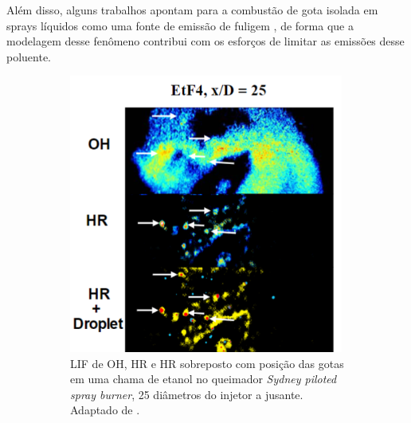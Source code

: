 Além disso, alguns trabalhos apontam para a combustão de gota isolada em sprays líquidos como uma fonte de emissão de fuligem \cite[e referências 3-13 \emph{loc. cit.}]{FachiniF2005}, de forma que a modelagem desse fenômeno contribui com os esforços de limitar as emissões desse poluente.

\begin{figure}[H]
    \centering
    \caption{Observações experimentais de combustão de gota isolada em chamas de etanol na Fig. \ref{fig:GounderJ2009-7.17} e \ref{fig:SinghG2020-10}, indicadas por setas, e ao redor de uma partícula de pó de alumínio na Fig. \ref{fig:Braconnier202PhD-5.20}. 
    Siglas: LIF -- \emph{Laser Induced Fluorescence}; HR -- \emph{Heat Release}.
    Adaptadas de \cite{GounderJ2009PhD,SinghG2020,Braconnier2020Pre}.
    }
    \begin{subfigure}[t]{0.39\textwidth}
        \centering
        \includegraphics[width=0.99\textwidth]{30_images/GounderJ2009-7.17-1.png}
        \caption{LIF de OH, HR e HR sobreposto com posição das gotas em uma chama de etanol no queimador \emph{Sydney piloted spray burner}, 25 diâmetros do injetor a jusante. Adaptado de \cite[Fig. 7.13]{GounderJ2009PhD}.}
        \label{fig:GounderJ2009-7.17}
    \end{subfigure}
    \hfill
    \begin{subfigure}[t]{0.59\textwidth}

\end{subfigure}
\end{figure}
